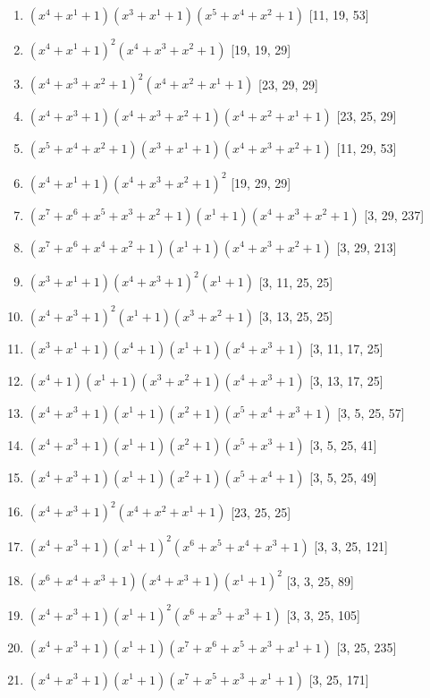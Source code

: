 \documentclass[10pt,twocolumn]{article}
\begin{document}
\begin{enumerate}
\item $(x^{4} + x^{1} + 1)(x^{3} + x^{1} + 1)(x^{5} + x^{4} + x^{2} + 1)$  [11, 19, 53]
\item $(x^{4} + x^{1} + 1)^{2}(x^{4} + x^{3} + x^{2} + 1)$  [19, 19, 29]
\item $(x^{4} + x^{3} + x^{2} + 1)^{2}(x^{4} + x^{2} + x^{1} + 1)$  [23, 29, 29]
\item $(x^{4} + x^{3} + 1)(x^{4} + x^{3} + x^{2} + 1)(x^{4} + x^{2} + x^{1} + 1)$  [23, 25, 29]
\item $(x^{5} + x^{4} + x^{2} + 1)(x^{3} + x^{1} + 1)(x^{4} + x^{3} + x^{2} + 1)$  [11, 29, 53]
\item $(x^{4} + x^{1} + 1)(x^{4} + x^{3} + x^{2} + 1)^{2}$  [19, 29, 29]
\item $(x^{7} + x^{6} + x^{5} + x^{3} + x^{2} + 1)(x^{1} + 1)(x^{4} + x^{3} + x^{2} + 1)$  [3, 29, 237]
\item $(x^{7} + x^{6} + x^{4} + x^{2} + 1)(x^{1} + 1)(x^{4} + x^{3} + x^{2} + 1)$  [3, 29, 213]
\item $(x^{3} + x^{1} + 1)(x^{4} + x^{3} + 1)^{2}(x^{1} + 1)$  [3, 11, 25, 25]
\item $(x^{4} + x^{3} + 1)^{2}(x^{1} + 1)(x^{3} + x^{2} + 1)$  [3, 13, 25, 25]
\item $(x^{3} + x^{1} + 1)(x^{4} + 1)(x^{1} + 1)(x^{4} + x^{3} + 1)$  [3, 11, 17, 25]
\item $(x^{4} + 1)(x^{1} + 1)(x^{3} + x^{2} + 1)(x^{4} + x^{3} + 1)$  [3, 13, 17, 25]
\item $(x^{4} + x^{3} + 1)(x^{1} + 1)(x^{2} + 1)(x^{5} + x^{4} + x^{3} + 1)$  [3, 5, 25, 57]
\item $(x^{4} + x^{3} + 1)(x^{1} + 1)(x^{2} + 1)(x^{5} + x^{3} + 1)$  [3, 5, 25, 41]
\item $(x^{4} + x^{3} + 1)(x^{1} + 1)(x^{2} + 1)(x^{5} + x^{4} + 1)$  [3, 5, 25, 49]
\item $(x^{4} + x^{3} + 1)^{2}(x^{4} + x^{2} + x^{1} + 1)$  [23, 25, 25]
\item $(x^{4} + x^{3} + 1)(x^{1} + 1)^{2}(x^{6} + x^{5} + x^{4} + x^{3} + 1)$  [3, 3, 25, 121]
\item $(x^{6} + x^{4} + x^{3} + 1)(x^{4} + x^{3} + 1)(x^{1} + 1)^{2}$  [3, 3, 25, 89]
\item $(x^{4} + x^{3} + 1)(x^{1} + 1)^{2}(x^{6} + x^{5} + x^{3} + 1)$  [3, 3, 25, 105]
\item $(x^{4} + x^{3} + 1)(x^{1} + 1)(x^{7} + x^{6} + x^{5} + x^{3} + x^{1} + 1)$  [3, 25, 235]
\item $(x^{4} + x^{3} + 1)(x^{1} + 1)(x^{7} + x^{5} + x^{3} + x^{1} + 1)$  [3, 25, 171]

\end{enumerate}
\end{document}

